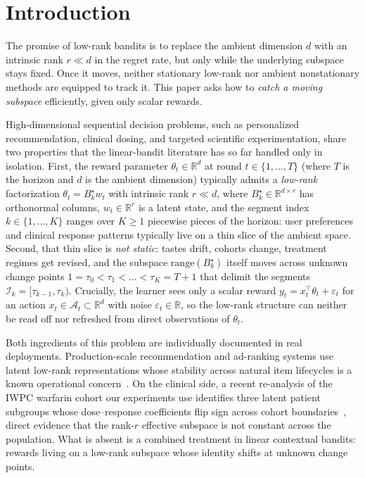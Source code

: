 \documentclass{article}
\newcommand{\R}{\mathbb{R}}
\newcommand{\cA}{\mathcal{A}}
\newcommand{\cI}{\mathcal{I}}
\newcommand{\range}{\mathrm{range}}
\begin{document}
\section{Introduction}
\label{sec:intro}

The promise of low-rank bandits is to replace the ambient dimension
$d$ with an intrinsic rank $r \ll d$ in the regret rate, but only
while the underlying subspace stays fixed. Once it moves, neither
stationary low-rank nor ambient nonstationary methods are equipped
to track it. This paper asks how to \emph{catch a moving subspace}
efficiently, given only scalar rewards.

High-dimensional sequential decision problems, such as personalized
recommendation, clinical dosing, and targeted scientific
experimentation, share two properties that the linear-bandit
literature has so far handled only in isolation. First, the reward
parameter $\theta_t\in\R^d$ at round $t\in\{1,\dots,T\}$ (where $T$
is the horizon and $d$ is the ambient dimension) typically admits a
\emph{low-rank} factorization $\theta_t=B_k^\star w_t$ with intrinsic
rank $r\ll d$, where $B_k^\star\in\R^{d\times r}$ has orthonormal
columns, $w_t\in\R^r$ is a latent state, and the segment index
$k\in\{1,\dots,K\}$ ranges over $K\ge 1$ piecewise pieces of the
horizon: user preferences and clinical response patterns
typically live on a thin slice of the ambient space.
Second, that thin slice is \emph{not static}: tastes drift, cohorts
change, treatment regimes get revised, and the subspace
$\range(B_k^\star)$ itself moves across unknown change points
$1=\tau_0<\tau_1<\dots<\tau_K=T{+}1$ that delimit the segments
$\cI_k=[\tau_{k-1},\tau_k)$. Crucially, the learner sees only a
scalar reward $y_t=x_t^\top\theta_t+\varepsilon_t$ for an action
$x_t\in\cA_t\subset\R^d$ with noise $\varepsilon_t\in\R$, so the
low-rank structure can neither be read off nor refreshed from direct
observations of $\theta_t$.

Both ingredients of this problem are individually documented in
real deployments. Production-scale recommendation and ad-ranking
systems use latent low-rank representations whose stability across
natural item lifecycles is a known operational
concern~\citep{zheng2025enhancing}. On the clinical side, a recent
re-analysis of the IWPC warfarin cohort our experiments use
identifies three latent patient subgroups whose dose--response
coefficients flip sign across cohort boundaries~\citep{liu2025change},
direct evidence that the rank-$r$ effective subspace is not constant
across the population. What is absent is a combined treatment in
linear contextual bandits: rewards living on a low-rank subspace
whose identity shifts at unknown change points.
\end{document}

